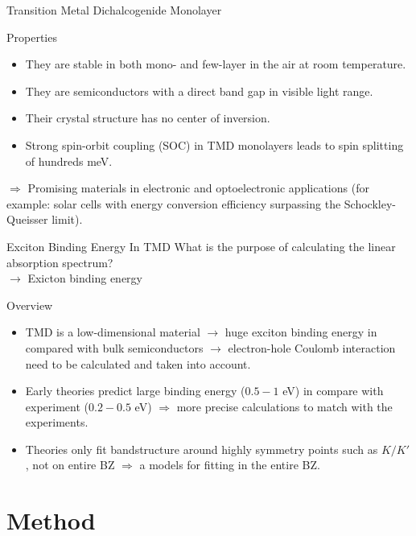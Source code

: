 \documentclass{beamer}
\begin{document}
	\begin{frame}{Transition Metal Dichalcogenide Monolayer}
\begin{block}{Properties}
\begin{itemize}
\item They are stable in both mono- and few-layer in the air at room temperature. \\
\item They are semiconductors with a direct band gap in visible light range.
\item Their crystal structure has no center of inversion.\\
\item Strong spin-orbit coupling (SOC) in TMD monolayers leads to spin splitting of hundreds meV.
\end{itemize}
\end{block}
		$\Rightarrow$ Promising materials in electronic and optoelectronic applications (for example: solar cells with energy conversion efficiency surpassing the Schockley-Queisser limit).
	\end{frame}
	\begin{frame}{Exciton Binding Energy In TMD}
		What is the purpose of calculating the linear absorption spectrum?\\ $\to$ Exicton binding energy
\begin{block}{Overview}
\begin{itemize}
\item TMD is a low-dimensional material $\to$ huge exciton binding energy in compared with bulk semiconductors $\to$ electron-hole Coulomb interaction need to be calculated and taken into account.
\item Early theories predict large binding energy ($0.5-1$ eV) in compare with experiment ($0.2-0.5$ eV) $\Rightarrow$ more precise calculations to match with the experiments.
\item Theories only fit bandstructure around highly symmetry points such as $K/K'$, not on entire BZ $\Rightarrow$ a models for fitting in the entire BZ.
		\end{itemize}
\end{block}
	\end{frame}
	\section{Method}
\end{document}
